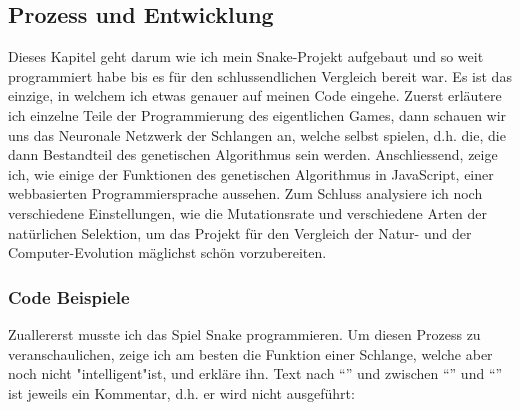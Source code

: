 \documentclass[11pt,a4paper,ngerman]{article}
\begin{document}
\subsection{Prozess und Entwicklung}

Dieses Kapitel geht darum wie ich mein Snake-Projekt aufgebaut und so weit programmiert habe bis es für den schlussendlichen Vergleich bereit war. Es ist das einzige, in welchem ich etwas genauer auf meinen Code eingehe. Zuerst erläutere ich einzelne Teile der Programmierung des eigentlichen Games, dann schauen wir uns das Neuronale Netzwerk der Schlangen an, welche selbst spielen, d.h. die, die dann Bestandteil des genetischen Algorithmus sein werden. Anschliessend, zeige ich, wie einige der Funktionen des genetischen Algorithmus in JavaScript, einer webbasierten Programmiersprache aussehen. Zum Schluss analysiere ich noch verschiedene Einstellungen, wie die Mutationsrate und verschiedene Arten der natürlichen Selektion, um das Projekt für den Vergleich der Natur- und der Computer-Evolution mäglichst schön vorzubereiten.

\subsubsection{Code Beispiele}

Zuallererst musste ich das Spiel Snake programmieren. Um diesen Prozess zu veranschaulichen, zeige ich am besten die  Funktion einer Schlange, welche aber noch nicht "intelligent"ist, und erkläre ihn. Text nach \enquote{\textCode{//}} und zwischen \enquote{\textCode{/*}} und \enquote{\textCode{*/}} ist jeweils ein Kommentar, d.h. er wird nicht ausgeführt:
\end{document}
